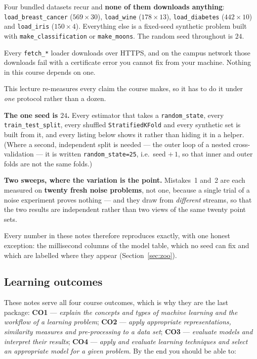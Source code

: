 \documentclass[11pt]{article}
\begin{document}
Four bundled datasets recur and \textbf{none of them downloads anything}:
\texttt{load\_breast\_cancer} ($569 \times 30$), \texttt{load\_wine}
($178 \times 13$), \texttt{load\_diabetes} ($442 \times 10$) and
\texttt{load\_iris} ($150 \times 4$). Everything else is a fixed-seed
synthetic problem built with \texttt{make\_classification} or
\texttt{make\_moons}. The random seed throughout is $24$.

\begin{caution}
Every \texttt{fetch\_*} loader downloads over HTTPS, and on the campus network
those downloads fail with a certificate error you cannot fix from your
machine. Nothing in this course depends on one.
\end{caution}

\begin{keyidea}
This lecture re-measures every claim the course makes, so it has to do it
under \emph{one} protocol rather than a dozen.

\textbf{The one seed is $24$.} Every estimator that takes a
\texttt{random\_state}, every \texttt{train\_test\_split}, every shuffled
\texttt{StratifiedKFold} and every synthetic set is built from it, and every
listing below shows it rather than hiding it in a helper. (Where a second,
independent split is needed --- the outer loop of a nested
cross-validation --- it is written \texttt{random\_state=25}, i.e.\ seed
$+\,1$, so that inner and outer folds are not the same folds.)

\textbf{Two sweeps, where the variation is the point.} Mistakes~1 and~2 are
each measured on \textbf{twenty fresh noise problems}, not one, because a
single trial of a noise experiment proves nothing --- and they draw from
\emph{different} streams, so that the two results are independent rather than
two views of the same twenty point sets.

Every number in these notes therefore reproduces exactly, with one honest
exception: the millisecond columns of the model table, which no
seed can fix and which are labelled where they appear (Section~\ref{sec:zoo}).
\end{keyidea}

\subsection{Learning outcomes}

These notes serve all four course outcomes, which is why they are the last
package: \textbf{CO1} --- \emph{explain the concepts and types of machine
learning and the workflow of a learning problem}; \textbf{CO2} --- \emph{apply
appropriate representations, similarity measures and pre-processing to a data
set}; \textbf{CO3} --- \emph{evaluate models and interpret their results};
\textbf{CO4} --- \emph{apply and evaluate learning techniques and select an
appropriate model for a given problem}. By the end you should be able to:
\end{document}
